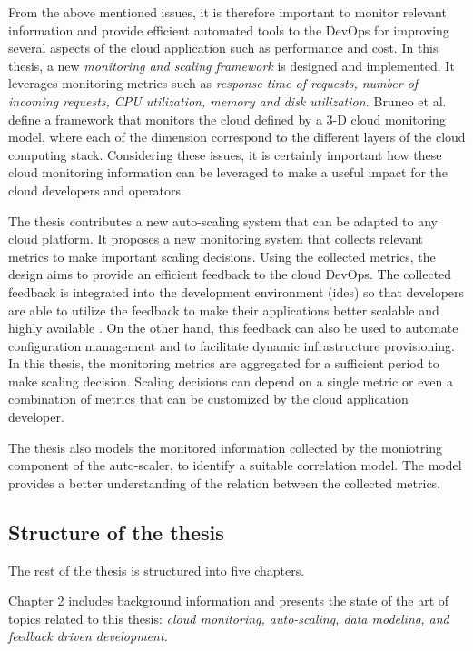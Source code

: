 \documentclass[article,type=msc,colorback,12pt,accentcolor=tud8b,table]{tudthesis}
\begin{document}
	From the above mentioned issues, it is therefore important to monitor relevant information and provide efficient automated tools to the DevOps for improving several aspects of the cloud application such as performance and cost. In this thesis, a new \textit{monitoring and scaling framework} is designed and implemented. It leverages monitoring metrics such as \textit{response time of requests, number of incoming requests, CPU utilization, memory and disk utilization.} Bruneo et al.\cite{bruneo2015framework} define a framework that monitors the cloud defined by a 3-D cloud monitoring model, where each of the dimension correspond to the different layers of the cloud computing stack. Considering these issues, it is certainly important how these cloud monitoring information can be leveraged to make a useful impact for the cloud developers and operators. 
	
	The thesis contributes a new auto-scaling system that can be adapted to any cloud platform. It proposes a new monitoring system that collects relevant metrics to make important scaling decisions. Using the collected metrics, the design aims to provide an efficient feedback to the cloud DevOps. The collected feedback is integrated into the development environment (\gls{ide}s) so that developers are able to utilize the feedback to make their applications better scalable and highly available \cite{cito2015runtime}. On the other hand, this feedback can also be used to automate configuration management and to facilitate dynamic infrastructure provisioning. In this thesis, the monitoring metrics are aggregated for a sufficient period to make scaling decision. Scaling decisions can depend on a single metric or even a combination of metrics that can be customized by the cloud application developer. 
	
	The thesis also models the monitored information collected by the moniotring component of the auto-scaler, to identify a suitable correlation model. The model provides a better understanding of the relation between the collected metrics. 
	
	\subsection{Structure of the thesis}

	\par The rest of the thesis is structured into five chapters.
	
	Chapter 2 includes background information and presents the state of the art of topics related to this thesis: \textit{cloud monitoring, auto-scaling, data modeling, and feedback driven development.} 
	
\end{document}
